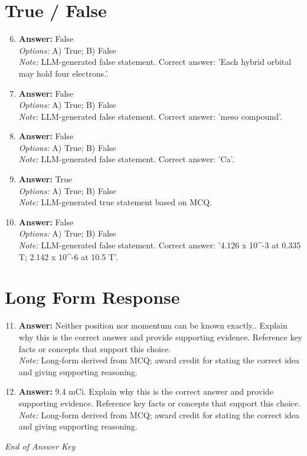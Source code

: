 \documentclass[12pt]{article}
\begin{document}
\section*{True / False}
\begin{enumerate}[label=\arabic*.]
\setcounter{enumi}{5}
\item \textbf{Answer:} False
\\ \textit{Options:} A) True; B) False
\\ \textit{Note:} LLM-generated false statement. Correct answer: 'Each hybrid orbital may hold four electrons.'.
\item \textbf{Answer:} False
\\ \textit{Options:} A) True; B) False
\\ \textit{Note:} LLM-generated false statement. Correct answer: 'meso compound'.
\item \textbf{Answer:} False
\\ \textit{Options:} A) True; B) False
\\ \textit{Note:} LLM-generated false statement. Correct answer: 'Ca'.
\item \textbf{Answer:} True
\\ \textit{Options:} A) True; B) False
\\ \textit{Note:} LLM-generated true statement based on MCQ.
\item \textbf{Answer:} False
\\ \textit{Options:} A) True; B) False
\\ \textit{Note:} LLM-generated false statement. Correct answer: '4.126 x 10^-3 at 0.335 T; 2.142 x 10^-6 at 10.5 T'.
\end{enumerate}

\section*{Long Form Response}
\begin{enumerate}[label=\arabic*.]
\setcounter{enumi}{10}
\item \textbf{Answer:} Neither position nor momentum can be known exactly.. Explain why this is the correct answer and provide supporting evidence. Reference key facts or concepts that support this choice.
\\ \textit{Note:} Long-form derived from MCQ; award credit for stating the correct idea and giving supporting reasoning.
\item \textbf{Answer:} 9.4 mCi. Explain why this is the correct answer and provide supporting evidence. Reference key facts or concepts that support this choice.
\\ \textit{Note:} Long-form derived from MCQ; award credit for stating the correct idea and giving supporting reasoning.
\end{enumerate}

\vfill
\noindent\textit{End of Answer Key}
\end{document}
